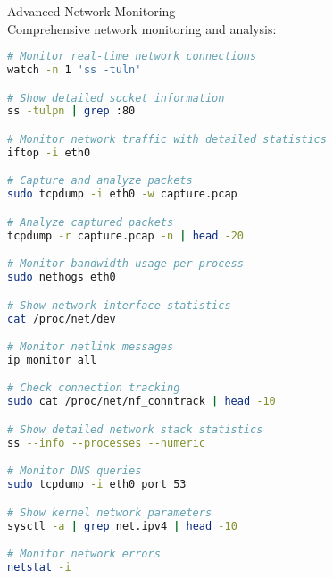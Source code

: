 \begin{example2}{Advanced Network Monitoring}\\
    Comprehensive network monitoring and analysis:
    
\begin{lstlisting}[language=bash, style=basesmol]
# Monitor real-time network connections
watch -n 1 'ss -tuln'

# Show detailed socket information
ss -tulpn | grep :80

# Monitor network traffic with detailed statistics
iftop -i eth0

# Capture and analyze packets
sudo tcpdump -i eth0 -w capture.pcap

# Analyze captured packets
tcpdump -r capture.pcap -n | head -20

# Monitor bandwidth usage per process
sudo nethogs eth0

# Show network interface statistics
cat /proc/net/dev

# Monitor netlink messages
ip monitor all

# Check connection tracking
sudo cat /proc/net/nf_conntrack | head -10

# Show detailed network stack statistics
ss --info --processes --numeric

# Monitor DNS queries
sudo tcpdump -i eth0 port 53

# Show kernel network parameters
sysctl -a | grep net.ipv4 | head -10

# Monitor network errors
netstat -i
\end{lstlisting}
\end{example2}
